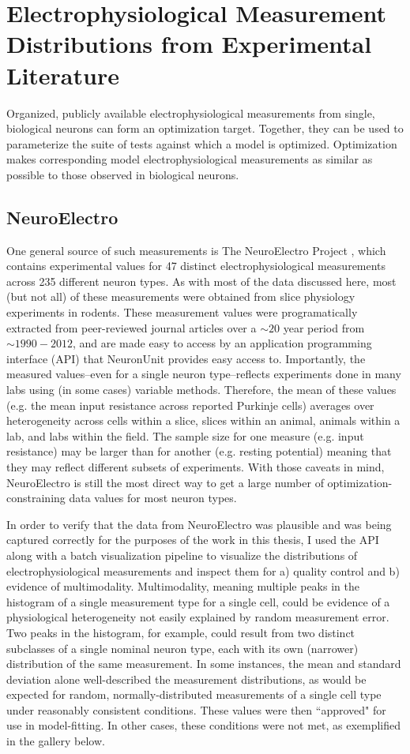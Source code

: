\section{Electrophysiological Measurement Distributions from Experimental Literature}\label{section:nelectro}
Organized, publicly available electrophysiological measurements from single, biological neurons can form an optimization target.
Together, they can be used to parameterize the suite of tests against which a model is optimized.
Optimization makes corresponding model electrophysiological measurements as similar as possible to those observed in biological neurons.

\subsection{NeuroElectro}
One general source of such measurements is The NeuroElectro Project \citep{tripathy2014neuroelectro}, which contains experimental values for 47 distinct electrophysiological measurements across 235 different neuron types.
As with most of the data discussed here, most (but not all) of these measurements were obtained from slice physiology experiments in rodents.
These measurement values were programatically extracted from peer-reviewed journal articles over a $\sim20$ year period from $\sim1990-2012$,
and are made easy to access by an application programming interface (API) that NeuronUnit provides easy access to.
Importantly, the measured values--even for a single neuron type--reflects experiments done in many labs using (in some cases) variable methods.
Therefore, the mean of these values (e.g. the mean input resistance across reported Purkinje cells) averages over heterogeneity across cells within a slice, slices within an animal, animals within a lab, and labs within the field.
The sample size for one measure (e.g. input resistance) may be larger than for another (e.g. resting potential) meaning that they may reflect different subsets of experiments.
With those caveats in mind, NeuroElectro is still the most direct way to get a large number of optimization-constraining data values for most neuron types.

In order to verify that the data from NeuroElectro was plausible and was being captured correctly for the purposes of the work in this thesis, I used the API along with a batch visualization pipeline to  visualize the distributions of electrophysiological measurements and inspect them for a) quality control and b) evidence of multimodality.
Multimodality, meaning multiple peaks in the histogram of a single measurement type for a single cell, could be evidence of a physiological heterogeneity not easily explained by random measurement error.
Two peaks in the histogram, for example, could result from two distinct subclasses of a single nominal neuron type, each with its own (narrower) distribution of the same measurement.
In some instances, the mean and standard deviation alone well-described the measurement distributions, as would be expected for random, normally-distributed measurements of a single cell type under reasonably consistent conditions.
These values were then ``approved" for use in model-fitting.
In other cases, these conditions were not met, as exemplified in the gallery below.

